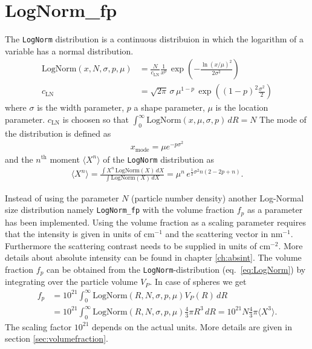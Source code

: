 \section{LogNorm\_fp} \hspace{1pt}
\label{sec:sd_lognorm_fp}

The \texttt{LogNorm} distribution is a continuous distribuion in which the logarithm of a variable
has a normal distribution.
\begin{subequations}
\begin{align}
\text{LogNorm}(x,N,\sigma,p,\mu) &=  \frac{N}{c_\text{LN}}
                                    \frac{1}{x^{p}}\,
                                    \exp\!\!\left(-\frac{\ln(x/\mu)^2}{2\sigma^2}\right) \\
c_\text{LN} &= \sqrt{2\pi}\,\sigma \,\mu^{1-p}
\,\exp\!\!\left((1-p)^2\frac{\sigma^2}{2}\right)
\label{eq:LogNorm}
\end{align}
\end{subequations}
where $\sigma$ is the width parameter, $p$ a shape parameter, $\mu$ is the location parameter.
$c_\text{LN}$ is choosen so that $\int_0^\infty\! \text{LogNorm}(x,\mu,\sigma,p)\,dR = N$
The mode of the distribution is defined as
\begin{align}
x_\text{mode} = \mu e^{-p \sigma^2}
\end{align}
and the $n^\text{th}$ moment $\langle X^n\rangle$ of the \texttt{LogNorm} distribution as
\begin{align}
\langle X^n\rangle = \frac{\int X^n\, \textrm{LogNorm}(X)\, dX}{\int \textrm{LogNorm}(X)\, dX} =
\mu^n \, e^{\frac{1}{2} \sigma^2 n (2 - 2 p + n)}.
\label{eq:nMoment:LogNorm}
\end{align}

Instead of using the parameter $N$ (particle number density) another
Log-Normal size distribution namely {\tt LogNorm\_fp} with the
volume fraction $f_p$ as a parameter has been implemented.
Using the volume fraction as a scaling parameter requires that the intensity is
given in units of cm$^{-1}$ and the scattering vector in nm$^{-1}$. Furthermore
the scattering contrast needs to be supplied in units of cm$^{-2}$. More details
about absolute intensity can be found in chapter \ref{ch:absint}.
The volume fraction $f_p$ can be obtained from the \texttt{LogNorm}-distribution
(eq.\ \ref{eq:LogNorm}) by integrating over the particle volume $V_P$. In case
of spheres we get
\begin{align}
f_p &= 10^{21} \int_0^\infty \mathrm{LogNorm}(R,N,\sigma,p,\mu) V_P(R) \, dR \label{eq:fpMomentsV} \\
    &= 10^{21} \int_0^\infty \mathrm{LogNorm}(R,N,\sigma,p,\mu) \frac{4}{3}\pi R^3 \, dR = 10^{21}
    N \frac{4}{3}\pi \langle X^3 \rangle .
\end{align}
The scaling factor $10^{21}$ depends on the actual units. More details are
given in section \ref{sec:volumefraction}.


